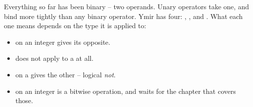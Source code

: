 Everything so far has been binary -- two operands. Unary operators take one, and
bind more tightly than any binary operator. Ymir has four: \token{-}, \token{&},
\token{*} and \token{!}. What each one means depends on the type it is applied
to:
\vspace{-8pt}%
\begin{itemize}
\setlength\itemsep{0.2mm}
\item \token{-} on an integer gives its opposite.
\item \token{-} does not apply to a  at all.
\item \token{!} on a  gives the other  -- logical
  \textit{not}.
\item \token{!} on an integer is a bitwise operation, and waits for the chapter
  that covers those.
\end{itemize}

